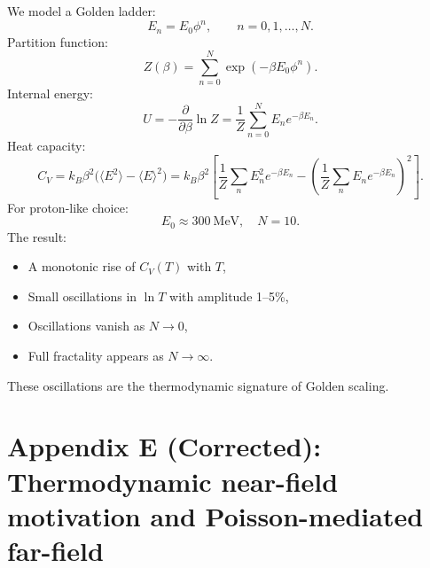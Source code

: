 \documentclass[11pt]{article}
\begin{document}
        We model a Golden ladder:
        \begin{equation}
            E_n = E_0 \phi^n,
            \qquad n = 0,1,\dots,N.
        \end{equation}
        Partition function:
        \begin{equation}
            Z(\beta) = \sum_{n=0}^N \exp(-\beta E_0 \phi^n).
        \end{equation}
        Internal energy:
        \begin{equation}
            U = - \frac{\partial}{\partial\beta} \ln Z
            = \frac{1}{Z} \sum_{n=0}^N E_n e^{-\beta E_n}.
        \end{equation}
        Heat capacity:
        \begin{equation}
            C_V
            = k_B \beta^2\big( \langle E^2\rangle - \langle E\rangle^2 \big)
            = k_B \beta^2
            \left[
                \frac{1}{Z} \sum_n E_n^2 e^{-\beta E_n}
                -
                \left(
                    \frac{1}{Z} \sum_n E_n e^{-\beta E_n}
                \right)^2
            \right].
        \end{equation}
        For proton-like choice:
        \begin{equation}
            E_0 \approx 300\ \mathrm{MeV}, \quad N = 10.
        \end{equation}
        The result:
        \begin{itemize}
            \item A monotonic rise of $C_V(T)$ with $T$,
            \item Small oscillations in $\ln T$ with amplitude 1--5\%,
            \item Oscillations vanish as $N \rightarrow 0$,
            \item Full fractality appears as $N \rightarrow \infty$.
        \end{itemize}
        These oscillations are the thermodynamic signature of Golden scaling.

    \section*{Appendix E (Corrected): Thermodynamic near-field motivation and Poisson-mediated far-field}
\end{document}

